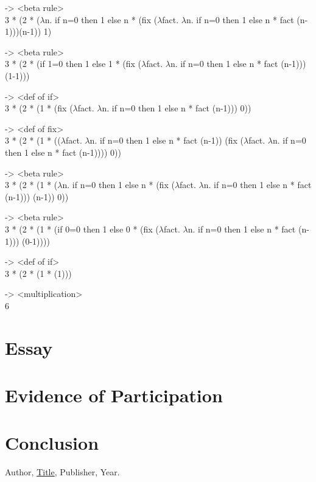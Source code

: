 \documentclass{article}
\theoremstyle{theorem}
\theoremstyle{definition}
\theoremstyle{remark}
\begin{document}
-> <beta rule>\\
3 * (2 * ($\lambda$n. if n=0 then 1 else n * (fix ($\lambda$fact. $\lambda$n. if n=0 then 1 else n * fact (n-1)))(n-1)) 1)

-> <beta rule>\\
3 * (2 * (if 1=0 then 1 else 1 * (fix ($\lambda$fact. $\lambda$n. if n=0 then 1 else n * fact (n-1)))(1-1)))

-> <def of if>\\
3 * (2 * (1 * (fix ($\lambda$fact. $\lambda$n. if n=0 then 1 else n * fact (n-1))) 0))

-> <def of fix>\\
3 * (2 * (1 * (($\lambda$fact. $\lambda$n. if n=0 then 1 else n * fact (n-1)) (fix ($\lambda$fact. $\lambda$n. if n=0 then 1 else n * fact (n-1)))) 0))

-> <beta rule>\\
3 * (2 * (1 * ($\lambda$n. if n=0 then 1 else n * (fix ($\lambda$fact. $\lambda$n. if n=0 then 1 else n * fact (n-1))) (n-1)) 0))

-> <beta rule>\\
3 * (2 * (1 * (if 0=0 then 1 else 0 * (fix ($\lambda$fact. $\lambda$n. if n=0 then 1 else n * fact (n-1))) (0-1))))

-> <def of if>\\
3 * (2 * (1 * (1)))

-> <multiplication>\\
6

\section{Essay}

\section{Evidence of Participation}

\section{Conclusion}\label{conclusion}

\begin{thebibliography}{99}
 Author, \href{https://en.wikipedia.org/wiki/LaTeX}{Title}, Publisher, Year.
\end{thebibliography}
\end{document}
